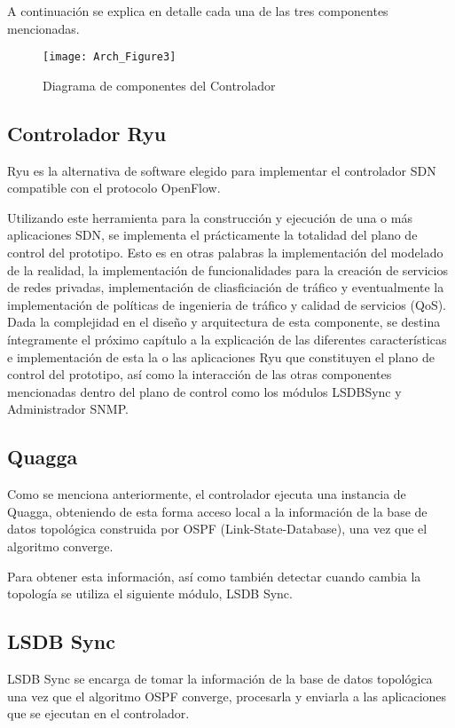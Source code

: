A continuación se explica en detalle cada una de las tres componentes mencionadas.

\newpage
\begin{figure}[htbp!] 
\centering    
\texttt{[image: Arch\_Figure3]}
\caption[OpenSourceRArch3]{Diagrama de componentes del Controlador}
\label{fig:OpenSourceRArch3}
\end{figure}


\subsection{Controlador Ryu}
Ryu es la alternativa de software elegido para implementar el controlador SDN compatible con el protocolo OpenFlow. 

Utilizando este herramienta para la construcci\'on y ejecuci\'on de una o m\'as aplicaciones SDN, se implementa el prácticamente la totalidad del plano de control del prototipo. Esto es en otras palabras la implementaci\'on del modelado de la realidad, la implementaci\'on de funcionalidades para la creaci\'on de servicios de redes privadas, implementaci\'on de cliasficiaci\'on de tr\'afico y eventualmente la implementaci\'on de pol\'iticas de ingenieria de tr\'afico y calidad de servicios (QoS).\\ 

Dada la complejidad en el diseño y arquitectura de esta componente, se destina íntegramente el próximo cap\'itulo a la explicaci\'on de las diferentes características e implementaci\'on de esta la o las aplicaciones Ryu que constituyen el plano de control del prototipo, as\'i como la interacci\'on de las otras componentes mencionadas dentro del plano de control como los m\'odulos LSDBSync y Administrador SNMP. 

\subsection{Quagga}
Como se menciona anteriormente, el controlador ejecuta una instancia de Quagga, obteniendo de esta forma acceso local a la información de la base de datos topol\'ogica construida por OSPF (Link-State-Database), una vez que el algoritmo converge.

Para obtener esta informaci\'on, as\'i como tambi\'en detectar cuando cambia la topolog\'ia se utiliza el siguiente m\'odulo, LSDB Sync.

\subsection{LSDB Sync}
LSDB Sync se encarga de tomar la información de la base de datos topol\'ogica una vez que el algoritmo OSPF converge, procesarla y enviarla a las aplicaciones que se ejecutan en el controlador.\\

